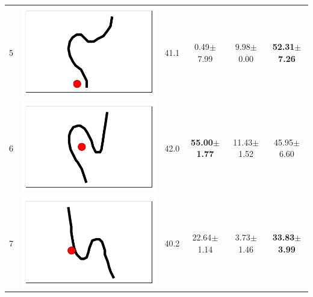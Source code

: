 \begin{table}[t]
{\begin{tabular}{llcccc}
5  &  \includegraphics[height= \shapesize cm]{tps-experiments/shapes/pts_17.png} &        41.1 &            0.49$\pm$7.99 &            9.98$\pm$0.00 &  \textbf{52.31$\pm$7.26} \\
6  &  \includegraphics[height= \shapesize cm]{tps-experiments/shapes/pts_18.png} &        42.0 &  \textbf{55.00$\pm$1.77} &           11.43$\pm$1.52 &           45.95$\pm$6.60 \\
7  &  \includegraphics[height= \shapesize cm]{tps-experiments/shapes/pts_19.png} &        40.2 &           22.64$\pm$1.14 &            3.73$\pm$1.46 &  \textbf{33.83$\pm$3.99} \\

\end{tabular}}
\end{table}
